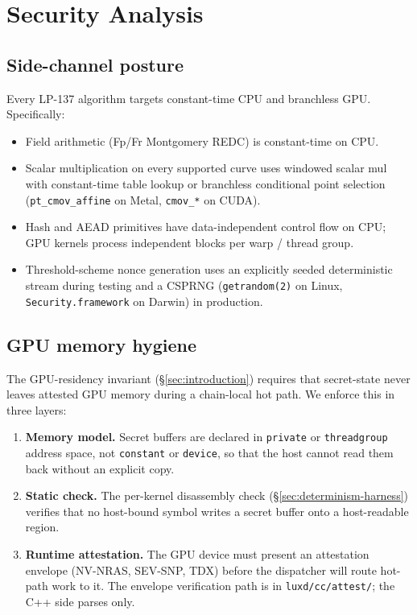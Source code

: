 \section{Security Analysis}
\label{sec:security}

\subsection{Side-channel posture}

Every LP-137 algorithm targets constant-time CPU and branchless GPU. Specifically:

\begin{itemize}
\item Field arithmetic (Fp/Fr Montgomery REDC) is constant-time on CPU.
\item Scalar multiplication on every supported curve uses windowed scalar mul with constant-time table lookup or branchless conditional point selection (\texttt{pt\_cmov\_affine} on Metal, \texttt{cmov\_*} on CUDA).
\item Hash and AEAD primitives have data-independent control flow on CPU; GPU kernels process independent blocks per warp / thread group.
\item Threshold-scheme nonce generation uses an explicitly seeded deterministic stream during testing and a CSPRNG (\texttt{getrandom(2)} on Linux, \texttt{Security.framework} on Darwin) in production.
\end{itemize}

\subsection{GPU memory hygiene}

The GPU-residency invariant (\S\ref{sec:introduction}) requires that secret-state never leaves attested GPU memory during a chain-local hot path. We enforce this in three layers:

\begin{enumerate}
\item \textbf{Memory model.} Secret buffers are declared in \texttt{private} or \texttt{threadgroup} address space, not \texttt{constant} or \texttt{device}, so that the host cannot read them back without an explicit copy.
\item \textbf{Static check.} The per-kernel disassembly check (\S\ref{sec:determinism-harness}) verifies that no host-bound symbol writes a secret buffer onto a host-readable region.
\item \textbf{Runtime attestation.} The GPU device must present an attestation envelope (NV-NRAS, SEV-SNP, TDX) before the dispatcher will route hot-path work to it. The envelope verification path is in \texttt{luxd/cc/attest/}; the C++ side parses only.
\end{enumerate}

